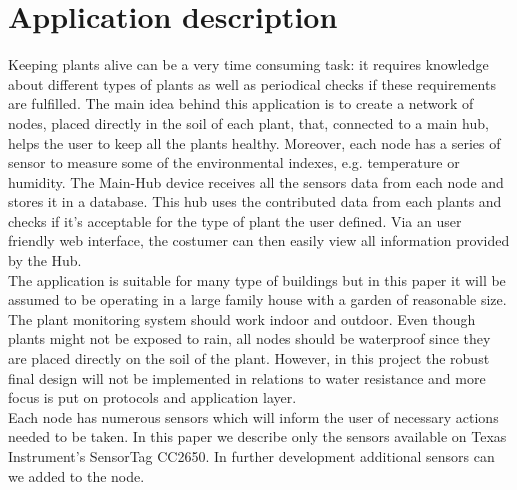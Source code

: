 \section{Application description}
Keeping plants alive can be a very time consuming task: it requires knowledge about different types of plants as well as periodical checks if these requirements are fulfilled. 
The main idea behind this application is to create a network of nodes, placed directly in the soil of each plant, that, connected to a main hub, helps the user to keep all the plants healthy. Moreover, each node has a series of sensor to measure some of the environmental indexes, e.g. temperature or humidity. The Main-Hub device receives all the sensors data from each node and stores it in a database. This hub uses the contributed data from each plants and checks if it's acceptable for the type of plant the user defined. Via an user friendly web interface, the costumer can then easily view all information provided by the Hub.\\
The application is suitable for many type of buildings but in this paper it will be assumed to be operating in a large family house with a garden of reasonable size. The plant monitoring system should work indoor and outdoor. Even though plants might not be exposed to rain, all nodes should be waterproof since they are placed directly on the soil of the plant. However, in this project the robust final design will not be implemented in relations to water resistance and more focus is put on protocols and application layer.\\
Each node has numerous sensors which will inform the user of necessary actions needed to be taken. In this paper we describe only the sensors available on Texas Instrument's SensorTag CC2650. In further development additional sensors can we added to the node.
 \\